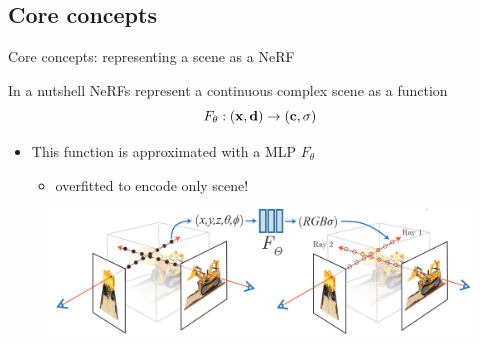 \documentclass[aspectratio=1610]{beamer}
\begin{document}
\subsection{Core concepts}
\begin{frame}{Core concepts: representing a scene as a NeRF}
    \begin{block}{In a nutshell}
        NeRFs represent a continuous complex scene as a function 
        \begin{equation*}
            F_\theta : (\vb{x}, \vb{d}) \rightarrow (\vb{c}, \sigma)
        \end{equation*}
    \end{block}
    \begin{itemize}
        \item This function is approximated with a MLP \(F_\theta\)
        \begin{itemize}
            \item  overfitted to encode only scene!
        \end{itemize}
    \end{itemize}
    \pause
    \bigskip
    \begin{figure}[H]
        \centering
        \includegraphics[width=.7\textwidth,keepaspectratio]{mapping}
    \end{figure}
\end{frame}
\end{document}
